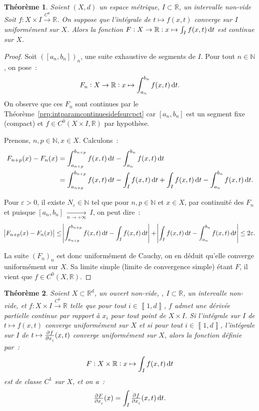 \documentclass{report}
\newtheorem{thm}{Théorème}[chapter]
\theoremstyle{definition}
\theoremstyle{remark}
\numberwithin{equation}{section}
\newcommand{\R}{\mathbb R}
\newcommand{\N}{\mathbb N}
\newcommand{\intint}[2]{\left\llbracket#1, #2\right\rrbracket}
\newcommand{\toC}[1]{\xrightarrow{C^{#1}}}
\newcommand{\tocont}{\toC 0}
\newcommand{\pinfty}{{+\infty}}
\begin{document}
			\begin{thm} Soient $(X, d)$ un espace métrique, $I \subset \R$, un intervalle non-vide Soit $f : X \times I \tocont \R$. On suppose que l'intégrale
			de $t \mapsto f(x, t)$ converge sur $I$ uniformément sur $X$. Alors la fonction $F : X \to \R : x \mapsto \int_I f(x, t)\dif t$ est continue sur $X$.
			\end{thm}

			\begin{proof} Soit $([a_n, b_n])_n$, une suite exhaustive de segments de $I$. Pour tout $n \in \N$, on pose~:
			\begin{equation}
				F_n : X \to \R : x \mapsto \int_{a_n}^{b_n}f(x, t)\dif t.
			\end{equation}
			On observe que ces $F_n$ sont continues par le Théorème~\ref{prp:intparamcontinuesidefsurcpct} car $[a_n, b_n]$ est un segment fixe (compact)
			et $f \in C^0(X \times I, \R)$ par hypothèse.

			Prenons, $n, p \in \N, x \in X$. Calculons~:
			\begin{align}
				F_{n+p}(x) - F_n(x) &= \int_{a_{n+p}}^{b_{n+p}}f(x, t)\dif t - \int_{a_n}^{b_n}f(x, t)\dif t \\
				&= \int_{a_{n+p}}^{b_{n+p}}f(x, t)\dif t - \int_If(x, t)\dif t + \int_If(x, t)\dif t - \int_{a_n}^{b_n}f(x, t)\dif t.
			\end{align}

			Pour $\varepsilon > 0$, il existe $N_\varepsilon \in \N$ tel que pour $n, p \in \N$ et $x \in X$, par continuité des $F_n$ et puisque
			$[a_n, b_n]~\xrightarrow[n \to \pinfty]{}~I$, on peut dire~:
			\begin{equation}
				\abs {F_{n+p}(x) - F_n(x)}
				\leq \abs {\int_{a_{n+p}}^{b_{n+p}}f(x, t)\dif t - \int_If(x, t)\dif t} + \abs {\int_If(x, t)\dif t - \int_{a_n}^{b_n}f(x, t)\dif t}
				\leq 2\varepsilon.
			\end{equation}

			La suite $(F_n)_n$ est donc uniformément de Cauchy, on en déduit qu'elle converge uniformément sur $X$. Sa limite simple (limite de convergence
			simple) étant $F$, il vient que $f \in C^0(X, \R)$.
			\end{proof}

			\begin{thm} Soient $X \subset \R^d$, un ouvert non-vide, , $I \subset \R$, un intervalle non-vide, et $f : X \times I \tocont \R$ telle que pour
			tout $i \in \intint 1d$, $f$ admet une dérivée partielle continue par rapport à $x_i$ pour tout point de $X \times I$. Si l'intégrale sur $I$ de
			$t \mapsto f(x, t)$ converge uniformément sur $X$ et si pour tout $i \in \intint 1d$, l'intégrale sur $I$ de $t \mapsto \pd f{x_i}(x, t)$ converge
			uniformément sur $X$, alors la fonction définie par~:
			\begin{equation}
				F : X \times \R : x \mapsto \int_If(x, t)\dif t
			\end{equation}
			est de classe $C^1$ sur $X$, et on a~:
			\begin{equation}
				\pd F{x_i}(x) = \int_I\pd f{x_i}(x, t)\dif t.
			\end{equation}
			\end{thm}
\end{document}
